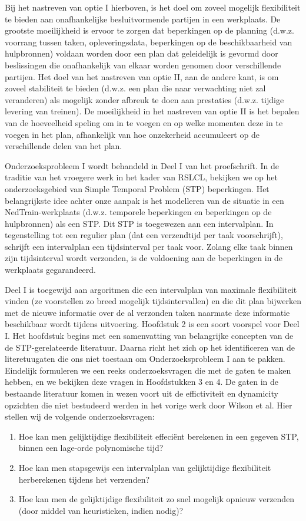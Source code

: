 Bij het nastreven van optie I hierboven, 
is het doel om zoveel mogelijk flexibiliteit te bieden aan onafhankelijke besluitvormende partijen in een werkplaats. 
De grootste moeilijkheid is ervoor te zorgen dat beperkingen op de planning 
(d.w.z. voorrang tussen taken, opleveringsdata, beperkingen op de beschikbaarheid van hulpbronnen) 
voldaan worden door een plan dat geleidelijk is gevormd door besli\-ssingen die onafhankelijk van elkaar worden genomen door verschillende partijen. 
Het doel van het nastreven van optie II, aan de andere kant, 
is om zoveel stabiliteit te bieden (d.w.z. een plan die naar verwachting niet zal veranderen) als mogelijk zonder afbreuk te doen aan prestaties (d.w.z. tijdige levering van treinen). 
De moeilijkheid in het nastreven van optie II is het bepalen van de hoeveelheid speling om in te voegen en op welke momenten deze in te voegen in het plan, 
afhankelijk van hoe onzekerheid accumuleert op de verschillende delen van het plan.

Onderzoeksprobleem I wordt behandeld in Deel I van het proefschrift. 
In de traditie van het vroegere werk in het kader van RSLCL, 
bekijken we op het onderzoeksgebied van Simple Temporal Problem (STP) beperkingen. 
Het belangrijkste idee achter onze aanpak is het modelleren van de situatie in een NedTrain-werkplaats (d.w.z. temporele beperkingen en beperkingen op de hulpbronnen) als een STP. 
Dit STP is toegewezen aan een intervalplan. 
In tegenstelling tot een regulier plan (dat een verzendtijd per taak voorschrijft), 
schrijft een intervalplan een tijdsinterval per taak voor. Zolang elke taak binnen zijn tijdsinterval wordt verzonden, 
is de voldoening aan de beperkingen in de werkplaats gegarandeerd.

Deel I is toegewijd aan argoritmen die een intervalplan van maximale flexibiliteit vinden (ze voorstellen zo breed mogelijk tijdsintervallen) 
en die dit plan bijwerken met de nieuwe informatie over de al verzonden taken naarmate deze informatie beschikbaar wordt tijdens uitvoering. 
Hoofdstuk 2 is een soort voorspel voor Deel I. 
Het hoofdstuk begins met een samenvatting van belangrijke concepten van de de STP-gerelateerde literatuur. 
Daarna richt het zich op het identificeren van de literetuugaten die ons niet toestaan om Onderzoeksprobleem I aan te pakken. 
Eindelijk formuleren we een reeks onderzoeksvragen die met de gaten te maken hebben, 
en we bekijken deze vragen in Hoofdstukken 3 en 4. 
De gaten in de bestaande literatuur komen in wezen voort uit de effictiviteit en dynamicity opzichten die niet bestudeerd werden in het vorige werk door Wilson et al. 
Hier stellen wij de volgende onderzoeksvragen:
\begin{enumerate}
	\item{Hoe kan men gelijktijdige flexibiliteit effeciënt berekenen in een gegeven STP, binnen een lage-orde polynomische tijd?}
	\item{Hoe kan men stapsgewijs een intervalplan van gelijktijdige flexibiliteit herberekenen tijdens het verzenden?}
	\item{Hoe kan men de gelijktijdige flexibiliteit zo snel mogelijk opnieuw verzenden (door middel van heuristieken, indien nodig)?}
\end{enumerate}

